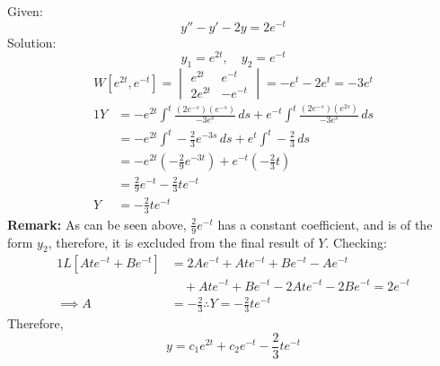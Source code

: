 \documentclass[diffeq.tex]{subfiles}
\begin{document}
\np
\begin{homework*}[146.2]
    Given:
    \begin{equation}
        y'' - y' - 2y = 2e^{-t}
    \end{equation}
    Solution:
    \begin{equation}
        y_{1} = e^{2t},\quad y_{2} = e^{-t}
    \end{equation}
    \begin{equation}
        W[e^{2t}, e^{-t}] = \begin{vmatrix}
            e^{2t} & e^{-t}\\
            2e^{2t} & -e^{-t}
        \end{vmatrix}
        = -e^{t} - 2e^{t} = -3e^{t}
    \end{equation}
    \begin{alignat}{1}
        Y &= -e^{2t}\int^{t}\frac{(2e^{-s})(e^{-s})}{-3e^{s}}\,ds + e^{-t}\int^{t}\frac{(2e^{-s})(e^{2s})}{-3e^{s}}\,ds\\
        &= -e^{2t}\int^{t}-\frac{2}{3}e^{-3s}\,ds + e^{t}\int^{t}-\frac{2}{3}\,ds\\
        &= -e^{2t}(-\frac{2}{9}e^{-3t}) + e^{-t}(-\frac{2}{3}t)\\
        &= \frac{2}{9}e^{-t}-\frac{2}{3}te^{-t}\\
        Y &= -\frac{2}{3}te^{-t}
    \end{alignat}
    \textbf{Remark:} As can be seen above, $\frac{2}{9}e^{-t}$ has a constant coefficient, and is of the form $y_{2}$, therefore, it is excluded from the final result of $Y$.
    Checking:
    \begin{alignat}{1}
        L[Ate^{-t} + Be^{-t}] &= 2Ae^{-t} + Ate^{-t} + Be^{-t} - Ae^{-t}\\
        &\quad +Ate^{-t}+Be^{-t} -2Ate^{-t} -2Be^{-t} = 2e^{-t}\\
        \implies A &= -\frac{2}{3} \therefore Y = -\frac{2}{3}te^{-t}
    \end{alignat}
    Therefore,
    \begin{equation}
        y = c_{1}e^{2t} + c_{2}e^{-t} - \frac{2}{3}te^{-t}
    \end{equation}
\end{homework*}
\end{document}
